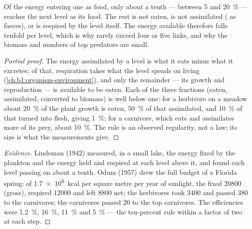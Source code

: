 \begin{theorem}\label{thm:b1:ecosystem-organization:lindeman}
Of the energy entering one  as food, only about a tenth
--- between \qty{5}{} and \qty{20}{\%} --- reaches the next level as
its food. The rest is not eaten, is not assimilated ( as faeces),
or is respired by the level itself. The energy available therefore
falls tenfold per level, which is why  rarely exceed four
or five links, and why the biomass and numbers of top predators are
small.
\end{theorem}
\begin{proof}[Partial proof]
The energy assimilated by a level is what it eats minus what it
excretes; of that, respiration takes what the level spends on living
(\cref{ch:b1:organism-environment}), and only the remainder --- its
growth and reproduction --- is available to be eaten. Each of the
three fractions (eaten, assimilated, converted to biomass) is well
below one: for a herbivore on a meadow about \qty{20}{\%} of the
plant growth is eaten, \qty{50}{\%} of that assimilated, and
\qty{10}{\%} of that turned into flesh, giving \qty{1}{\%}; for a
carnivore, which eats and assimilates more of its prey, about
\qty{10}{\%}. The rule is an observed regularity, not a law; its size
is what the measurements give.
\end{proof}
\begin{proof}[Evidence]
Lindeman (1942) measured, in a small lake, the energy fixed by the
plankton and the energy held and respired at each level above it, and
found each level passing on about a tenth. Odum (1957) drew the full
budget of a Florida spring: of \qty{1.7e6}{kcal} per square metre per
year of sunlight, the  fixed \num{20800} (gross), respired
\num{12000} and left \num{8800} net; the herbivores took \num{3400}
and passed \num{380} to the carnivores; the carnivores passed
\num{20} to the top carnivores. The efficiencies were \qty{1.2}{\%},
\qty{16}{\%}, \qty{11}{\%} and \qty{5}{\%} --- the ten-percent rule
within a factor of two at each step.
\end{proof}

